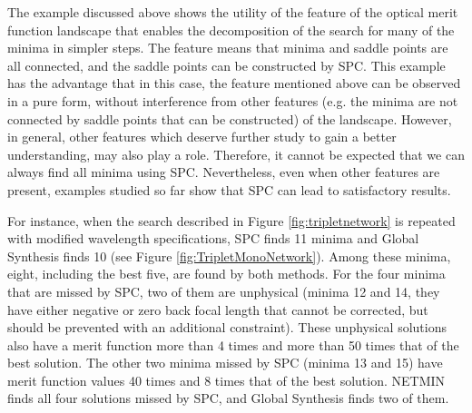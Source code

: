 The example discussed above shows the utility of the feature of the optical merit function landscape that enables the decomposition of the search for many of the minima in simpler steps. The feature means that minima and saddle points are all connected, and the saddle points can be constructed by SPC. This example has the advantage that in this case, the feature mentioned above can be observed in a pure form, without interference from other features (e.g. the minima are not connected by saddle points that can be constructed) of the landscape. However, in general, other features which deserve further study to gain a better understanding, may also play a role. Therefore, it cannot be expected that we can always find all minima using SPC. Nevertheless, even when other features are present, examples studied so far show that SPC can lead to satisfactory results.

For instance, when the search described in Figure \ref{fig:tripletnetwork} is repeated with modified wavelength specifications, SPC finds 11 minima and Global Synthesis finds 10 (see Figure \ref{fig:TripletMonoNetwork}). Among these minima, eight, including the best five, are found by both methods. For the four minima that are missed by SPC, two of them are unphysical (minima 12 and 14, they have either negative or zero back focal length that cannot be corrected, but should be prevented with an additional constraint). These unphysical solutions also have a merit function more than 4 times and more than 50 times that of the best solution. The other two minima missed by SPC (minima 13 and 15) have merit function values 40 times and 8 times that of the best solution. NETMIN finds all four solutions missed by SPC, and Global Synthesis finds two of them.


